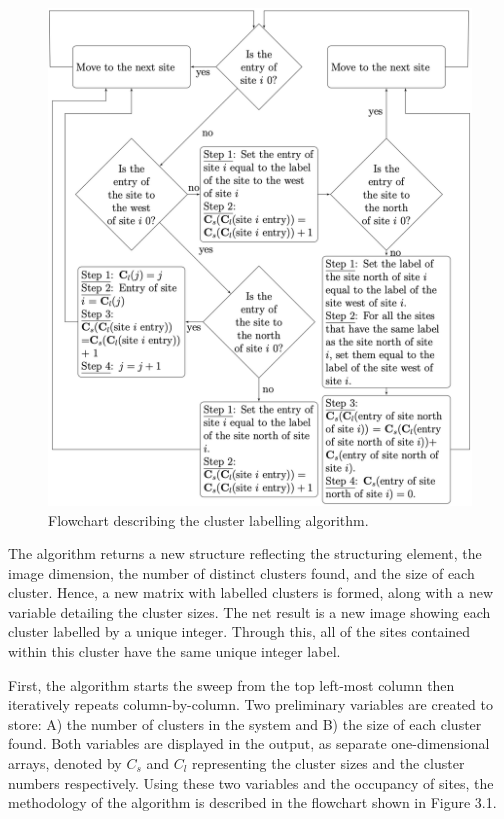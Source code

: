 \begin{figure}
    \centering
    \includegraphics[scale=0.55]{appendix/figures/CCA-Flow.pdf}
    \caption{Flowchart describing the cluster labelling algorithm.}
    \label{fig:my_label}
\end{figure}

The algorithm returns a new structure reflecting the structuring element, 
the image dimension, the number of distinct clusters found, and the size of each cluster. 
Hence, a new matrix with labelled clusters is formed, along with a new variable detailing the cluster sizes. 
The net result is a new image showing each cluster labelled by a unique integer. 
Through this, all of the sites contained within this cluster have the same unique integer label.

First, the algorithm starts the sweep from the top left-most column then iteratively repeats column-by-column. 
Two preliminary variables are created to store: A) the number of clusters in the system and B) the size of each cluster found. 
Both variables are displayed in the output, as separate one-dimensional arrays, denoted by $C_s$ and $C_l$ representing the cluster sizes and the cluster numbers respectively. 
Using these two variables and the occupancy of sites, the methodology of the algorithm is described in the flowchart shown in Figure 3.1.

